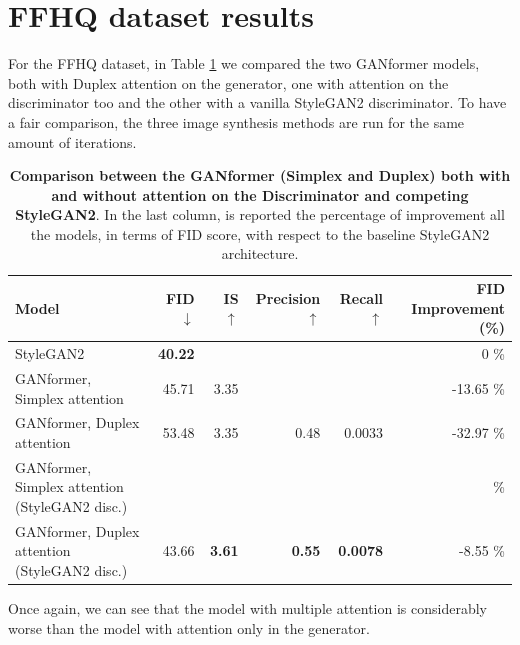 \documentclass{article}
\begin{document}
\section{FFHQ dataset results}\label{sec:ffhq_results}
For the FFHQ dataset, in Table \ref{tab:results_ffhq} we compared the two GANformer models, both with Duplex attention on the generator, one with attention on the discriminator too and the other with a vanilla StyleGAN2 discriminator.
To have a fair comparison, the three image synthesis methods are run for the same amount of 
iterations.
\begin{table}[htb]
	\centering
	\caption{\textbf{Comparison between the GANformer (Simplex and Duplex) both with and without 
	attention on the Discriminator and competing StyleGAN2}. In the last column, is reported the percentage of improvement all the models, in terms of FID score, with respect to the baseline StyleGAN2 architecture.}
	\label{tab:results_ffhq}
	\vspace{3mm}
	\small
	\begin{tabular}{l|rrrrr}
		\toprule
		\textbf{Model}  & \textbf{FID $\downarrow$}  & \textbf{IS $\uparrow$} & 
		\textbf{Precision$\uparrow$}  & \textbf{Recall $\uparrow$} & \textbf{FID Improvement (\%)}\\ 
		\midrule
		StyleGAN2                    				&  \textbf{40.22} &  &  &  & 0 \%\\ 
		GANformer, Simplex attention & 45.71 & 3.35 &  &  & -13.65 \%\\ 
		GANformer, Duplex attention  & {53.48} & 3.35 & 0.48& 0.0033 & -32.97 \%\\ 
		GANformer, Simplex attention (StyleGAN2 disc.)  &   &   &   &  &  \%\\ 
		GANformer, Duplex attention (StyleGAN2 disc.)  &  {43.66}  & \textbf{3.61} &   \textbf{0.55}   & \textbf{0.0078} & -{8.55} \%\\ 
		\bottomrule
	\end{tabular}
\end{table}

Once again, we can see that the model with multiple attention is considerably worse than the model with attention only in the generator. 
\end{document}
